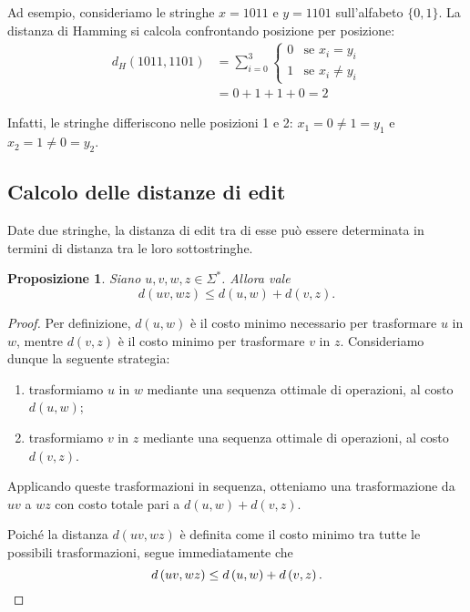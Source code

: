 \documentclass[a4paper,12pt]{report}
\theoremstyle{propositionstyle}
\newtheorem{prop}{Proposizione}[chapter]
\begin{document}
    Ad esempio, consideriamo le stringhe $x = 1011$ e $y = 1101$ sull'alfabeto $\{0, 1\}$. La distanza di Hamming si calcola confrontando posizione per posizione:
    \begin{align*}
        d_H(1011, 1101) &= \sum_{i=0}^{3} \begin{cases}
                                              0 & \text{se } x_i = y_i \\
                                              1 & \text{se } x_i \neq y_i
        \end{cases} \\
        &= 0 + 1 + 1 + 0 = 2
    \end{align*}

    Infatti, le stringhe differiscono nelle posizioni 1 e 2: $x_1 = 0 \neq 1 = y_1$ e $x_2 = 1 \neq 0 = y_2$.

    \subsection{Calcolo delle distanze di edit}

    Date due stringhe, la distanza di edit tra di esse può essere determinata in termini di distanza tra le loro sottostringhe.

    \begin{prop}
        Siano $u,v,w,z \in \Sigma^*$. Allora vale
        \[
            d\left(uv, wz\right) \leq d\left(u,w\right) + d\left(v,z\right).
        \]
    \end{prop}

    \begin{proof}
        Per definizione, $d\left(u,w\right)$ è il costo minimo necessario per trasformare $u$ in $w$, mentre $d\left(v,z\right)$ è il costo minimo per trasformare $v$ in $z$.
        Consideriamo dunque la seguente strategia:
        \begin{enumerate}
            \item trasformiamo $u$ in $w$ mediante una sequenza ottimale di operazioni, al costo $d\left(u,w\right)$;
            \item trasformiamo $v$ in $z$ mediante una sequenza ottimale di operazioni, al costo $d\left(v,z\right)$.
        \end{enumerate}
        Applicando queste trasformazioni in sequenza, otteniamo una trasformazione da $uv$ a $wz$ con costo totale pari a $d\left(u,w\right)+d\left(v,z\right)$.

        Poiché la distanza $d\left(uv,wz\right)$ è definita come il costo minimo tra tutte le possibili trasformazioni, segue immediatamente che
        \[
            d\left(uv, wz\right) \leq d\left(u,w\right) + d\left(v,z\right). \qedhere
        \]
    \end{proof}
\end{document}
